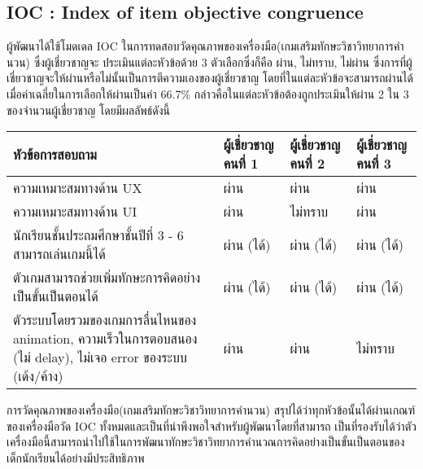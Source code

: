 \subsection{IOC : Index of item objective congruence}
ผู้พัฒนาได้ใช้โมดเดล IOC ในการทดสอบวัดคุณภาพของเครื่องมือ(เกมเสริมทักษะวิชาวิทยาการคำนวน) ซึ่งผู้เชี่ยวชาญจะ
ประเมินแต่ละหัวข้อด้วย 3 ตัวเลือกซึ่งก็คือ ผ่าน, ไม่ทราบ, ไม่ผ่าน ซึ่งการที่ผู้เชี่ยวชาญจะให้ผ่านหรือไม่นั้นเป็นการตีความเองของผู้เชี่ยวชาญ
โดยที่ในแต่ละหัวข้อจะสามารถผ่านได้เมื่อค่าเฉลี่ยในการเลือกให้ผ่านเป็นค่า 66.7\% กล่าวคือในแต่ละหัวข้อต้องถูกประเมินให้ผ่าน 2 ใน 3 ของจำนวนผู้เชี่ยวชาญ โดยมีผลลัพธ์ดังนี้
\begin{center}
    \begin{tabular}{ |p{3cm}|p{3cm}|p{3cm}|p{3cm}| }
        \hline
        หัวข้อการสอบถาม & ผู้เชี่ยวชาญคนที่ 1 & ผู้เชี่ยวชาญคนที่ 2 & ผู้เชี่ยวชาญคนที่ 3\\
        \hline
        ความเหมาะสมทางด้าน UX & ผ่าน & ผ่าน & ผ่าน\\
        \hline
        ความเหมาะสมทางด้าน UI & ผ่าน & ไม่ทราบ & ผ่าน\\
        \hline
        นักเรียนชั้นประถมศึกษาชั้นปีที่ 3 - 6 สามารถเล่นเกมนี้ได้ & ผ่าน (ได้) & ผ่าน (ได้) & ผ่าน (ได้)\\
        \hline
        ตัวเกมสามารถช่วยเพิ่มทักษะการคิดอย่างเป็นขั้นเป็นตอนได้ & ผ่าน (ได้) & ผ่าน (ได้) & ผ่าน (ได้)\\
        \hline
        ตัวระบบโดยรวมของเกมการลื่นไหนของ animation, ความเร็วในการตอบสนอง (ไม่ delay), ไม่เจอ error ของระบบ (เด้ง/ค้าง) & ผ่าน & ผ่าน & ไม่ทราบ\\
        \hline
    \end{tabular}
\end{center}
การวัดคุณภาพของเครื่องมือ(เกมเสริมทักษะวิชาวิทยาการคำนวน) สรุปได้ว่าทุกหัวข้อนั้นได้ผ่านเกณฑ์ของเครื่องมือวัด IOC ทั้งหมดและเป็นที่น่าพึงพอใจสำหรับผู้พัฒนาโดยที่สามารถ
เป็นที่รองรับได้ว่าตัวเครื่องมือนี้สามารถนำไปใช้ในการพัฒนาทักษะวิชาวิทยาการคำนวณการคิดอย่างเป็นขั้นเป็นตอนของเด็กนักเรียนได้อย่างมีประสิทธิภาพ



